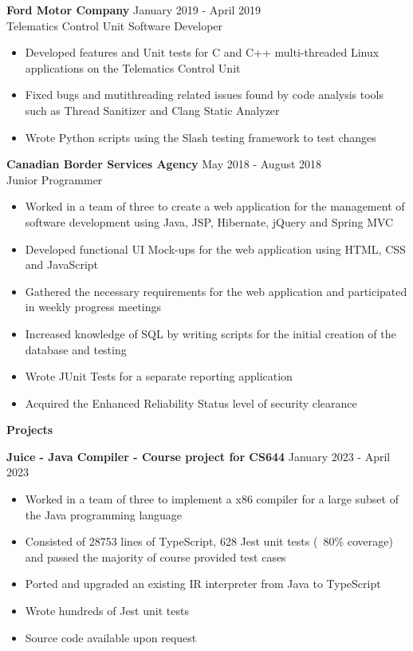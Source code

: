 \documentclass[10pt]{article}
\begin{document}
\textbf{Ford Motor Company}
\hfill January 2019 - April 2019 \\ Telematics Control Unit Software Developer
\begin{itemize}[noitemsep]
    \item Developed features and Unit tests for C and C++ multi-threaded Linux applications on the Telematics Control Unit
    \item Fixed bugs and mutithreading related issues found by code analysis tools such as Thread Sanitizer and Clang Static Analyzer
    \item Wrote Python scripts using the Slash testing framework to test changes
\end{itemize}

\textbf{Canadian Border Services Agency}
\hfill May 2018 - August 2018 \\ Junior Programmer
\begin{itemize}[noitemsep]
    \item Worked in a team of three to create a web application for the management of software development using Java, JSP, Hibernate, jQuery and Spring MVC
    \item Developed functional UI Mock-ups for the web application using HTML, CSS and JavaScript
    \item Gathered the necessary requirements for the web application and participated in weekly progress meetings
    \item Increased knowledge of SQL by writing scripts for the initial creation of the database and testing
    \item Wrote JUnit Tests for a separate reporting application
    \item Acquired the Enhanced Reliability Status level of security clearance
\end{itemize}

\newpage

{\Large\textbf{Projects}}\space \hrulefill

\textbf{Juice - Java Compiler - Course project for CS644} \hfill January 2023 - April 2023
\begin{itemize}[noitemsep]
    \item Worked in a team of three to implement a x86 compiler for a large subset of the Java programming language
    \item Consisted of 28753 lines of TypeScript, 628 Jest unit tests (~80\% coverage) and passed the majority of course provided test cases
    \item Ported and upgraded an existing IR interpreter from Java to TypeScript
    \item Wrote hundreds of Jest unit tests
    \item Source code available upon request
\end{itemize}
\end{document}
